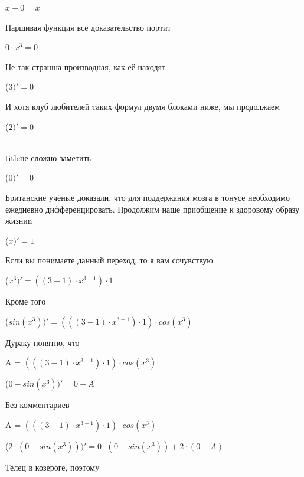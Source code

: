 \documentclass[12pt,a4paper,fleqn]{article}
\begin{document}
\begin{center}
$x-0 = x$\end{center}
Паршивая функция всё доказательство портит\cite{link2}

\begin{center}
$0 \cdot x^{3} = 0$\end{center}
Не так страшна производная, как её находят\cite{link2}

\begin{center}
 ($3)'
  = 0$\end{center}
И хотя клуб любителей таких формул двумя блоками ниже, мы продолжаем

\begin{center}
 ($2)'
  = 0$\end{center}
\\ title{не сложно заметить} 

\begin{center}
 ($0)'
  = 0$\end{center}
Британские учёные доказали, что для поддержания мозга в тонусе необходимо ежедневно дифференцировать. Продолжим наше приобщение к здоровому образу жизниn

\begin{center}
 ($x)'
  = 1$\end{center}
Если вы понимаете данный переход, то я вам сочувствую

\begin{center}
 ($x^{3})'
  = ((3-1) \cdot x^{3-1}) \cdot 1$\end{center}
Кроме того

\begin{center}
 ($sin(x^{3}))'
  = (((3-1) \cdot x^{3-1}) \cdot 1) \cdot cos(x^{3})$\end{center}
Дураку понятно, что

\begin{center}
A = $(((3-1) \cdot x^{3-1}) \cdot 1) \cdot cos(x^{3})$\end{center}
\begin{center}
 ($0-sin(x^{3}))'
  = 0-A$\end{center}
Без комментариев\cite{link4}

\begin{center}
A = $(((3-1) \cdot x^{3-1}) \cdot 1) \cdot cos(x^{3})$\end{center}
\begin{center}
 ($2 \cdot (0-sin(x^{3})))'
  = 0 \cdot (0-sin(x^{3}))+2 \cdot (0-A)$\end{center}
Телец в козероге, поэтому
\end{document}
